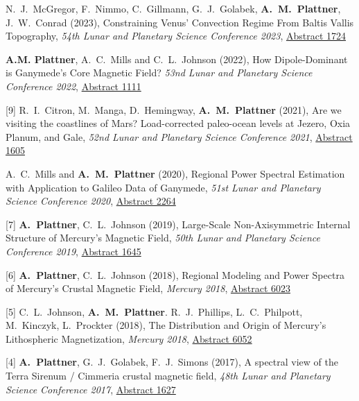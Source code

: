 \documentclass[10pt]{article}
\begin{document}
\spcp
\shift [11] N.~J.~McGregor, F.~Nimmo, C.~Gillmann, G.~J.~Golabek, \textbf{A.~M.~Plattner}, J.~W.~Conrad (2023), Constraining Venus' Convection Regime From Baltis Vallis Topography, \emph{54th Lunar and Planetary Science Conference 2023},
\href{https://www.hou.usra.edu/meetings/lpsc2023/pdf/1724.pdf}{Abstract 1724}


\spcp
\shift [10] \textbf{A.M. Plattner}, A.~C.~Mills and C.~L.~Johnson (2022), How Dipole-Dominant is Ganymede's Core Magnetic Field?
\emph{53nd Lunar and Planetary Science Conference 2022},
\href{https://www.hou.usra.edu/meetings/lpsc2022/pdf/1111.pdf}{Abstract 1111}

\spcp
\hspace{-0.5cm}[9] R.~I.~Citron, M.~Manga, D.~Hemingway, \textbf{A.~M.~Plattner} (2021),
Are we visiting the coastlines of Mars? Load-corrected paleo-ocean levels at Jezero, Oxia Planum, and Gale,
\emph{52nd Lunar and Planetary Science Conference 2021},
\href{https://www.hou.usra.edu/meetings/lpsc2021/pdf/1605.pdf}{Abstract 1605}

\spcp
\hspace{-0.77cm} \gr[8] A.~C.~Mills and \textbf{A.~M.~Plattner}
(2020),
Regional Power Spectral Estimation with Application to Galileo Data of Ganymede,
\emph{51st Lunar and Planetary Science Conference 2020},
\href{https://www.hou.usra.edu/meetings/lpsc2020/pdf/2264.pdf}{Abstract 2264}

\spcp
\hspace{-0.5cm}[7] \textbf{A.~Plattner}, C.~L.~Johnson (2019), Large-Scale Non-Axisymmetric Internal Structure of Mercury's Magnetic Field,
\emph{50th Lunar and Planetary Science Conference 2019},
\href{https://www.hou.usra.edu/meetings/lpsc2019/pdf/1645.pdf}{Abstract 1645}


\spcp
\hspace{-0.5cm}[6] \textbf{A.~Plattner}, C.~L.~Johnson (2018),
Regional Modeling and Power Spectra of Mercury's Crustal Magnetic Field,
\emph{Mercury 2018},
\href{https://www.hou.usra.edu/meetings/mercury2018/pdf/6023.pdf}{Abstract 6023}

\spcp
\hspace{-0.5cm}[5] C.~L.~Johnson,
\textbf{A.~M.~Plattner}. R.~J.~Phillips, L.~C.~Philpott, M.~Kinczyk,
L.~Prockter (2018), The Distribution and Origin of Mercury's Lithospheric Magnetization, \emph{Mercury 2018},
\href{https://www.hou.usra.edu/meetings/mercury2018/pdf/6052.pdf}{Abstract
  6052}

\spcp
\hspace{-0.5cm}[4] \textbf{A.~Plattner}, G.~J.~Golabek, F.~J.~Simons (2017),
A spectral view of the Terra Sirenum / Cimmeria crustal magnetic
field,
\emph{48th Lunar and Planetary Science Conference 2017},
\href{http://www.lpi.usra.edu/meetings/lpsc2017/pdf/1627.pdf}{Abstract 1627}
\end{document}
